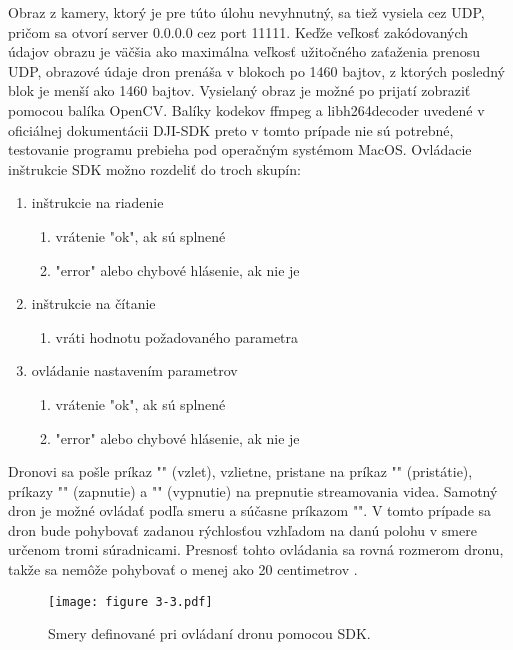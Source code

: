 {Obraz z kamery, ktorý je pre túto úlohu nevyhnutný, sa tiež vysiela cez UDP, pričom sa otvorí server 0.0.0.0 cez port 11111. Keďže veľkosť zakódovaných údajov obrazu je väčšia ako maximálna veľkosť užitočného zaťaženia prenosu UDP, obrazové údaje dron prenáša v blokoch po 1460 bajtov, z ktorých posledný blok je menší ako 1460 bajtov. Vysielaný obraz je možné po prijatí zobraziť pomocou balíka OpenCV. Balíky kodekov ffmpeg a libh264decoder uvedené v oficiálnej dokumentácii DJI-SDK preto v tomto prípade nie sú potrebné, testovanie programu prebieha pod operačným systémom MacOS. 
Ovládacie inštrukcie SDK možno rozdeliť do troch skupín: 
\begin{enumerate}
\item inštrukcie na riadenie 
\begin{enumerate}
    \item vrátenie "ok", ak sú splnené 
    \item "error" alebo chybové hlásenie, ak nie je 
\end{enumerate}
\item inštrukcie na čítanie 
\begin{enumerate}
    \item vráti hodnotu požadovaného parametra
\end{enumerate}
\item ovládanie nastavením parametrov 
\begin{enumerate}
    \item vrátenie "ok", ak sú splnené 
    \item "error" alebo chybové hlásenie, ak nie je 
\end{enumerate}
\end{enumerate}



Dronovi sa pošle príkaz "" (vzlet), vzlietne, pristane na príkaz "" (pristátie), príkazy "" (zapnutie) a "" (vypnutie) na prepnutie streamovania videa. Samotný dron je možné ovládať podľa smeru a súčasne príkazom "". V tomto prípade sa dron bude pohybovať zadanou rýchlosťou vzhľadom na danú polohu v smere určenom tromi súradnicami. Presnosť tohto ovládania sa rovná rozmerom dronu, takže sa nemôže pohybovať o menej ako 20 centimetrov \citep{TelloSDK}. 

\begin{figure}[ht!]
    \centering
    \texttt{[image: figure 3-3.pdf]}
    \caption{Smery definované pri ovládaní dronu pomocou SDK.}
    \label{o:3-3}


\end{figure}}
